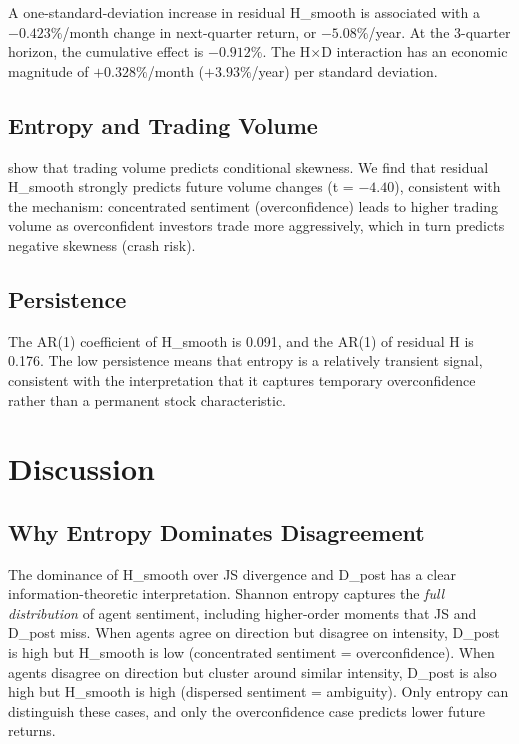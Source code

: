\documentclass[12pt,a4paper]{article}
\begin{document}
A one-standard-deviation increase in residual H\_smooth is associated with a $-0.423\%$/month change in next-quarter return, or $-5.08\%$/year. At the 3-quarter horizon, the cumulative effect is $-0.912\%$. The H$\times$D interaction has an economic magnitude of $+0.328\%$/month ($+3.93\%$/year) per standard deviation.

\subsection{Entropy and Trading Volume}

\citet{ChenHongStein2001} show that trading volume predicts conditional skewness. We find that residual H\_smooth strongly predicts future volume changes (t = $-4.40$), consistent with the mechanism: concentrated sentiment (overconfidence) leads to higher trading volume as overconfident investors trade more aggressively, which in turn predicts negative skewness (crash risk).

\subsection{Persistence}

The AR(1) coefficient of H\_smooth is 0.091, and the AR(1) of residual H is 0.176. The low persistence means that entropy is a relatively transient signal, consistent with the interpretation that it captures temporary overconfidence rather than a permanent stock characteristic.

\section{Discussion}\label{sec:discussion}

\subsection{Why Entropy Dominates Disagreement}

The dominance of H\_smooth over JS divergence and D\_post has a clear information-theoretic interpretation. Shannon entropy captures the \textit{full distribution} of agent sentiment, including higher-order moments that JS and D\_post miss. When agents agree on direction but disagree on intensity, D\_post is high but H\_smooth is low (concentrated sentiment = overconfidence). When agents disagree on direction but cluster around similar intensity, D\_post is also high but H\_smooth is high (dispersed sentiment = ambiguity). Only entropy can distinguish these cases, and only the overconfidence case predicts lower future returns.
\end{document}
